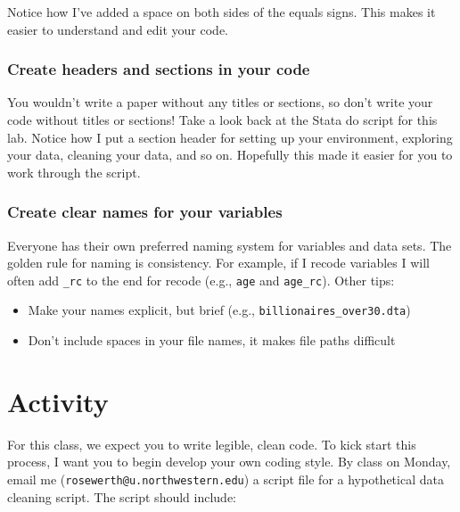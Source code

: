\documentclass[
]{book}
\providecommand{\tightlist}{%
  \setlength{\itemsep}{0pt}\setlength{\parskip}{0pt}}
\begin{document}
Notice how I've added a space on both sides of the equals signs. This makes it easier to understand and edit your code.

\hypertarget{create-headers-and-sections-in-your-code}{%
\subsubsection*{Create headers and sections in your code}\label{create-headers-and-sections-in-your-code}}

You wouldn't write a paper without any titles or sections, so don't write your code without titles or sections! Take a look back at the Stata do script for this lab. Notice how I put a section header for setting up your environment, exploring your data, cleaning your data, and so on. Hopefully this made it easier for you to work through the script.

\hypertarget{create-clear-names-for-your-variables}{%
\subsubsection*{Create clear names for your variables}\label{create-clear-names-for-your-variables}}

Everyone has their own preferred naming system for variables and data sets. The golden rule for naming is consistency. For example, if I recode variables I will often add \texttt{\_rc} to the end for recode (e.g., \texttt{age} and \texttt{age\_rc}). Other tips:

\begin{itemize}
\tightlist
\item
  Make your names explicit, but brief (e.g., \texttt{billionaires\_over30.dta})
\item
  Don't include spaces in your file names, it makes file paths difficult
\end{itemize}

\hypertarget{activity}{%
\section{Activity}\label{activity}}

For this class, we expect you to write legible, clean code. To kick start this process, I want you to begin develop your own coding style. By class on Monday, email me (\texttt{rosewerth@u.northwestern.edu}) a script file for a hypothetical data cleaning script. The script should include:
\end{document}
